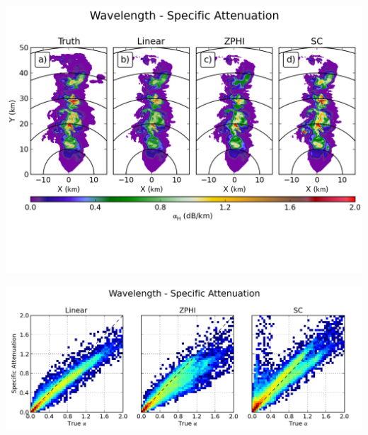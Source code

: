\documentclass[red]{beamer}
\begin{document}
\begin{frame}
	\begin{center}
		\includegraphics[scale=0.55]{figures/C_Wavelength_Specific_Attenuation.png}
	\end{center}
\end{frame}

\begin{frame}
	\begin{center}
		\includegraphics[scale=0.45]{figures/C_Wavelength_Specific_Attenuation_scatter.png}
	\end{center}
\end{frame}
\end{document}
